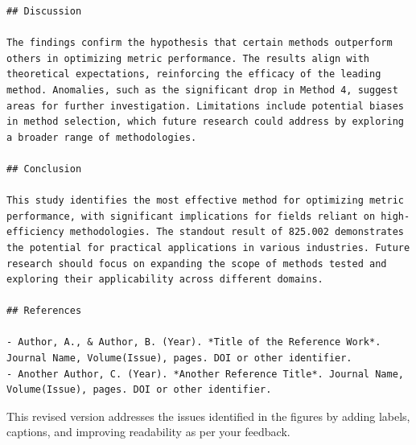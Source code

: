 \documentclass{article}
\begin{document}
\begin{verbatim}
## Discussion

The findings confirm the hypothesis that certain methods outperform others in optimizing metric performance. The results align with theoretical expectations, reinforcing the efficacy of the leading method. Anomalies, such as the significant drop in Method 4, suggest areas for further investigation. Limitations include potential biases in method selection, which future research could address by exploring a broader range of methodologies.

## Conclusion

This study identifies the most effective method for optimizing metric performance, with significant implications for fields reliant on high-efficiency methodologies. The standout result of 825.002 demonstrates the potential for practical applications in various industries. Future research should focus on expanding the scope of methods tested and exploring their applicability across different domains.

## References

- Author, A., & Author, B. (Year). *Title of the Reference Work*. Journal Name, Volume(Issue), pages. DOI or other identifier.
- Another Author, C. (Year). *Another Reference Title*. Journal Name, Volume(Issue), pages. DOI or other identifier.
\end{verbatim}

This revised version addresses the issues identified in the figures by adding labels, captions, and improving readability as per your feedback.
\end{document}
